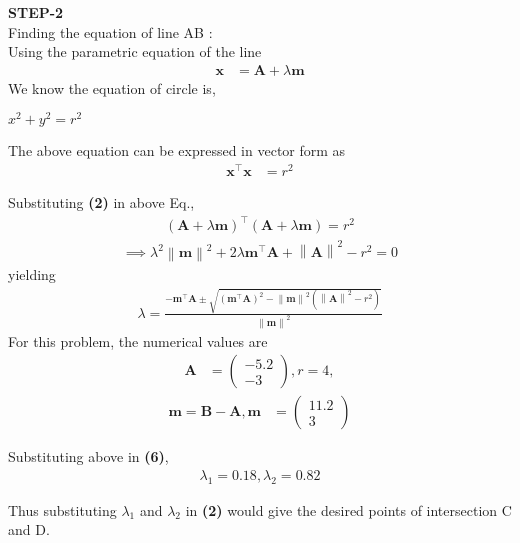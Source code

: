 \documentclass[10pt,a4paper]{report}
\providecommand{\norm}[1]{\left\lVert#1\right\rVert}
\providecommand{\brak}[1]{\ensuremath{\left(#1\right)}}
\newcommand{\myvec}[1]{\ensuremath{\begin{pmatrix}#1\end{pmatrix}}}
\let\vec\mathbf
\begin{document}
\begin{multicols}{2}
\textbf{STEP-2}\vspace{2mm}\\
Finding the equation of line AB : \\\vspace{2mm}
Using the parametric equation of the line
		    \begin{align}
			    \label{eq:line-param}
			    \vec{x} &= \vec{A} + \lambda \vec{m}
		    \end{align}
We know the equation of circle is,\\
\begin{center}
    $ x^2 + y^2 = r^2 $ \vspace{2mm}
\end{center}
The above equation can be expressed in vector form as
		    \begin{align}
			    \label{eq:circ-param}
			    \vec{x}^{\top}\vec{x} &= r^2
		    \end{align}
		    
Substituting \textbf{(2)} in above Eq.,
\begin{align}
	\brak{ \vec{A} + \lambda \vec{m}}^{\top}
	\brak{ \vec{A} + \lambda \vec{m}}
	= r^2
\end{align}
\begin{align}
    \implies \lambda^2\norm{\vec{m}}^2+ 2 \lambda \vec{m}^{\top}\vec{A}+\norm{\vec{A}}^2 - r^2 = 0
\end{align}
yielding 
		    {\small
		    \begin{align}
			    \label{eq:cbse-2020-circ_lam}
		\lambda = \frac{-\vec{m}^{\top}\vec{A}\pm \sqrt{\brak{\vec{m}^{\top}\vec{A}}^2 -\norm{\vec{m}}^2\brak{\norm{\vec{A}}^2 - r^2 }}}{\norm{\vec{m}}^2}
		    \end{align}
		    }
For this problem, the numerical values are
\begin{align}
\vec{A} &= \myvec{-5.2 \\ -3}, r = 4, 
\end{align}
\begin{align}
\vec{m} = \vec{B} - \vec{A}, \vec{m} &= \myvec{11.2 \\ 3}
\end{align}

Substituting above in \textbf{(6)},
\begin{align}
\lambda_1 = 0.18, \lambda_2 = 0.82
\end{align}

Thus substituting $\lambda_1$ and $\lambda_2$ in {\textbf{(2)}} would give the desired points of intersection C and D.\vspace{2mm}\\


\end{multicols}
\end{document}
